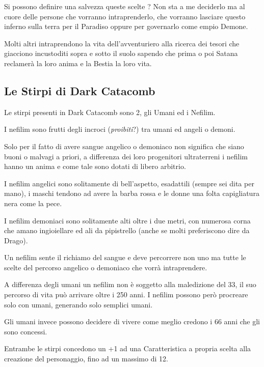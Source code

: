 \documentclass[12pt,a4paper,twoside,openany]{book}
\begin{document}
\begin{multicols}{2}
Si possono definire una salvezza queste scelte ? Non sta a me deciderlo ma al cuore delle persone che vorranno intraprenderlo, che vorranno lasciare questo inferno sulla terra per il Paradiso oppure per governarlo come empio Demone.

Molti altri intraprendono la vita dell'avventuriero alla ricerca dei tesori che giacciono incustoditi sopra e sotto il suolo sapendo che prima o poi Satana reclamerà la loro anima e la Bestia la loro vita.

\subsection{Le Stirpi di Dark Catacomb}


Le stirpi presenti in Dark Catacomb sono 2, gli Umani ed i Nefilim.

I nefilim sono frutti degli incroci (\textit{proibiti}?) tra umani ed angeli o demoni.

Solo per il fatto di avere sangue angelico o demoniaco non significa che siano buoni o malvagi a priori, a differenza dei loro progenitori ultraterreni i nefilim hanno un anima e come tale sono dotati di libero arbitrio.

I nefilim angelici sono solitamente di bell'aspetto, esadattili (sempre sei dita per mano), i maschi tendono ad avere la barba rossa e le donne una folta capigliatura nera come la pece.

I nefilim demoniaci sono solitamente alti oltre i due metri, con numerosa corna che amano ingioiellare ed ali da pipistrello (anche se molti preferiscono dire da Drago).

Un nefilim sente il richiamo del sangue e deve percorrere non uno ma tutte le scelte del percorso angelico o demoniaco che vorrà intraprendere.

A differenza degli umani un nefilim non è soggetto alla maledizione del 33, il suo percorso di vita può arrivare oltre i 250 anni. I nefilim possono però procreare solo con umani, generando solo semplici umani.

Gli umani invece possono decidere di vivere come meglio credono i 66 anni che gli sono concessi.

Entrambe le stirpi concedono un +1 ad una Caratteristica a propria scelta alla creazione del personaggio, fino ad un massimo di 12.
	
\end{multicols}
\end{document}
